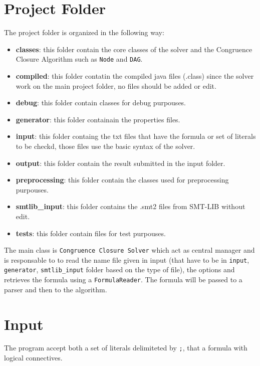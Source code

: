 \documentclass[11pt,a4paper]{article}
\begin{document}
    \section{Project Folder}
    The project folder is organized in the following way:
    \begin{itemize}
        \item \textbf{classes}: this folder contain the core classes of the solver and the 
        Congruence Closure Algorithm such as \texttt{Node} and \texttt{DAG}.
        \item  \textbf{compiled}: this folder contatin the compiled java files (.class) since
        the solver work on the main project folder, no files should be added or edit.
        \item \textbf{debug}: this folder contain classes for debug purpouses.
        \item \textbf{generator}: this folder containain the properties files.
        \item \textbf{input}: this folder containg the txt files that have the formula or set of 
        literals to be checkd, those files use the basic syntax of the solver.
        \item \textbf{output}: this folder contain the result submitted in the input folder.
        \item \textbf{preprocessing}: this folder contain the classes used for preprocessing purpouses.
        \item \textbf{smtlib\_input}: this folder contains the .smt2 files from SMT-LIB without edit.
        \item \textbf{tests}: this folder contain files for test purpouses.
    \end{itemize}

    The main class is \texttt{Congruence Closure Solver} which act as central manager and 
    is responsable to to read the name file given in input 
    (that have to be in \texttt{input}, \texttt{generator}, 
    \texttt{smtlib\_input} folder based on the type of file), the options and 
    retrieves the formula using a \texttt{FormulaReader}.
    The formula will be passed to a parser and then to the algorithm.

    \section{Input}

    The program accept both a set of literals delimiteted by \texttt{;}, that a formula 
    with logical connectives.
    
\end{document}
